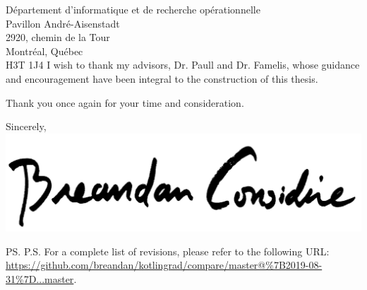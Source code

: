 \documentclass{letter}
\begin{document}
\begin{letter}{D\'epartement d'informatique et de recherche op\'erationnelle \\ Pavillon Andr\'e-Aisenstadt \\ 2920, chemin de la Tour \\ Montr\'eal, Qu\'ebec \\ H3T 1J4}
        I wish to thank my advisors, Dr. Paull and Dr. Famelis, whose guidance and encouragement have been integral to the construction of this thesis.

        Thank you once again for your time and consideration.

        \closing{Sincerely,\\
            \includegraphics[scale=0.06]{signature.png}\\
        }
        \ps{P.S. For a complete list of revisions, please refer to the following URL: \url{https://github.com/breandan/kotlingrad/compare/master@\%7B2019-08-31\%7D...master}.}
    \end{letter}
\end{document}
